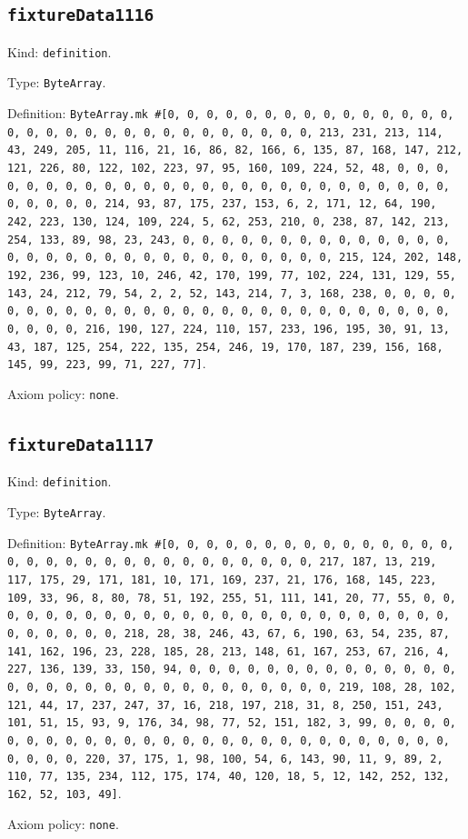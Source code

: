 \documentclass[11pt]{article}
\begin{document}
\subsection*{\texttt{fixtureData1116}}
\noindent Kind: \texttt{definition}.\par
\noindent Type: \texttt{ByteArray}.\par
\noindent Definition: \texttt{ByteArray.mk \#[0, 0, 0, 0, 0, 0, 0, 0, 0, 0, 0, 0, 0, 0, 0, 0, 0, 0, 0, 0, 0, 0, 0, 0, 0, 0, 0, 0, 0, 0, 0, 213, 231, 213, 114, 43, 249, 205, 11, 116, 21, 16, 86, 82, 166, 6, 135, 87, 168, 147, 212, 121, 226, 80, 122, 102, 223, 97, 95, 160, 109, 224, 52, 48, 0, 0, 0, 0, 0, 0, 0, 0, 0, 0, 0, 0, 0, 0, 0, 0, 0, 0, 0, 0, 0, 0, 0, 0, 0, 0, 0, 0, 0, 0, 0, 214, 93, 87, 175, 237, 153, 6, 2, 171, 12, 64, 190, 242, 223, 130, 124, 109, 224, 5, 62, 253, 210, 0, 238, 87, 142, 213, 254, 133, 89, 98, 23, 243, 0, 0, 0, 0, 0, 0, 0, 0, 0, 0, 0, 0, 0, 0, 0, 0, 0, 0, 0, 0, 0, 0, 0, 0, 0, 0, 0, 0, 0, 0, 0, 215, 124, 202, 148, 192, 236, 99, 123, 10, 246, 42, 170, 199, 77, 102, 224, 131, 129, 55, 143, 24, 212, 79, 54, 2, 2, 52, 143, 214, 7, 3, 168, 238, 0, 0, 0, 0, 0, 0, 0, 0, 0, 0, 0, 0, 0, 0, 0, 0, 0, 0, 0, 0, 0, 0, 0, 0, 0, 0, 0, 0, 0, 0, 0, 216, 190, 127, 224, 110, 157, 233, 196, 195, 30, 91, 13, 43, 187, 125, 254, 222, 135, 254, 246, 19, 170, 187, 239, 156, 168, 145, 99, 223, 99, 71, 227, 77]}.\par
\noindent Axiom policy: \texttt{none}.\par
\subsection*{\texttt{fixtureData1117}}
\noindent Kind: \texttt{definition}.\par
\noindent Type: \texttt{ByteArray}.\par
\noindent Definition: \texttt{ByteArray.mk \#[0, 0, 0, 0, 0, 0, 0, 0, 0, 0, 0, 0, 0, 0, 0, 0, 0, 0, 0, 0, 0, 0, 0, 0, 0, 0, 0, 0, 0, 0, 0, 217, 187, 13, 219, 117, 175, 29, 171, 181, 10, 171, 169, 237, 21, 176, 168, 145, 223, 109, 33, 96, 8, 80, 78, 51, 192, 255, 51, 111, 141, 20, 77, 55, 0, 0, 0, 0, 0, 0, 0, 0, 0, 0, 0, 0, 0, 0, 0, 0, 0, 0, 0, 0, 0, 0, 0, 0, 0, 0, 0, 0, 0, 0, 0, 218, 28, 38, 246, 43, 67, 6, 190, 63, 54, 235, 87, 141, 162, 196, 23, 228, 185, 28, 213, 148, 61, 167, 253, 67, 216, 4, 227, 136, 139, 33, 150, 94, 0, 0, 0, 0, 0, 0, 0, 0, 0, 0, 0, 0, 0, 0, 0, 0, 0, 0, 0, 0, 0, 0, 0, 0, 0, 0, 0, 0, 0, 0, 0, 219, 108, 28, 102, 121, 44, 17, 237, 247, 37, 16, 218, 197, 218, 31, 8, 250, 151, 243, 101, 51, 15, 93, 9, 176, 34, 98, 77, 52, 151, 182, 3, 99, 0, 0, 0, 0, 0, 0, 0, 0, 0, 0, 0, 0, 0, 0, 0, 0, 0, 0, 0, 0, 0, 0, 0, 0, 0, 0, 0, 0, 0, 0, 0, 220, 37, 175, 1, 98, 100, 54, 6, 143, 90, 11, 9, 89, 2, 110, 77, 135, 234, 112, 175, 174, 40, 120, 18, 5, 12, 142, 252, 132, 162, 52, 103, 49]}.\par
\noindent Axiom policy: \texttt{none}.\par
\end{document}
